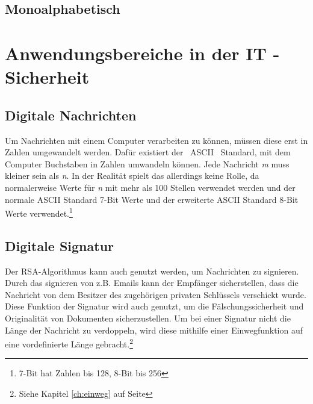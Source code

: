 \documentclass[14pt,a4paper]{scrartcl}
\begin{document}
	\subsection{Monoalphabetisch}
\pagebreak

\section{Anwendungsbereiche in der IT - Sicherheit}
	\subsection{Digitale Nachrichten}
Um Nachrichten mit einem Computer verarbeiten zu können, müssen diese erst in Zahlen umgewandelt werden. Dafür existiert der ~ASCII~ Standard, mit dem Computer Buchstaben in Zahlen umwandeln können. Jede Nachricht \textit{m} muss kleiner sein als \textit{n}. In der Realität spielt das allerdings keine Rolle, da normalerweise Werte für \textit{n} mit mehr als 100 Stellen verwendet werden und der normale ASCII Standard 7-Bit Werte und der erweiterte ASCII Standard 8-Bit Werte verwendet.\footnote{7-Bit hat Zahlen bis 128, 8-Bit bis 256}
	
	\subsection{Digitale Signatur}
	Der RSA-Algorithmus kann auch genutzt werden, um Nachrichten zu signieren. Durch das signieren von z.B. Emails kann der Empfänger sicherstellen, dass die Nachricht von dem Besitzer des zugehörigen privaten Schlüssels verschickt wurde. Diese Funktion der Signatur wird auch genutzt, um die Fälschungssicherheit und Originalität von  Dokumenten sicherzustellen. Um bei einer Signatur nicht die Länge der Nachricht zu verdoppeln, wird diese mithilfe einer Einwegfunktion auf eine vordefinierte Länge gebracht.\footnote{Siehe Kapitel \ref{ch:einweg} auf Seite \pageref{ch:einweg}}\\
\end{document}
